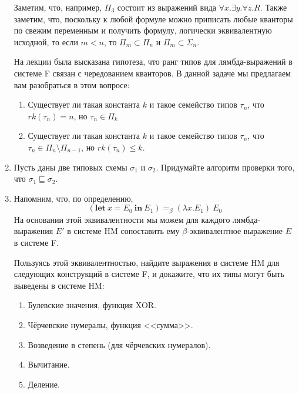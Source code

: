 \documentclass[10pt,a4paper,oneside]{article}
\begin{document}
\begin{enumerate}
Заметим, что, например, $\Pi_3$ состоит из выражений вида $\forall x.\exists y.\forall z.R$.
Также заметим, что, поскольку к любой формуле можно приписать любые кванторы по свежим переменным
и получить формулу, логически эквивалентную исходной, 
то если $m < n$, то $\Pi_m \subset \Pi_n$ и $\Pi_m \subset \Sigma_n$.

На лекции была высказана гипотеза, что ранг типов для лямбда-выражений в системе F связан с чередованием
кванторов. В данной задаче мы предлагаем вам разобраться в этом вопросе:

\begin{enumerate}
\item Существует ли такая константа $k$ и такое семейство типов $\tau_n$, что $rk(\tau_n)=n$, но $\tau_n \in \Pi_k$
\item Существует ли такая константа $k$ и такое семейство типов $\tau_n$, что $\tau_n \in \Pi_n \setminus \Pi_{n-1}$, но $rk(\tau_n) \le k$.
\end{enumerate}

\item Пусть даны две типовых схемы $\sigma_1$ и $\sigma_2$. Придумайте алгоритм проверки того, что
$\sigma_1 \sqsubseteq \sigma_2$.

\item Напомним, что, по определению, $$(\textbf{let}\ x = E_0\ \textbf{in}\ E_1) =_\beta (\lambda x.E_1)\ E_0$$
На основании этой эквивалентности мы можем для каждого лямбда-выражения $E'$ в системе HM сопоставить ему
$\beta$-эквивалентное выражение $E$ в системе F.

Пользуясь этой эквивалентностью, найдите выражения в системе HM для следующих конструкций в системе F,
и докажите, что их типы могут быть выведены в системе HM:
\begin{enumerate}
\item Булевские значения, функция XOR.
\item Чёрчевские нумералы, функция <<сумма>>.
\item Возведение в степень (для чёрчевских нумералов).
\item Вычитание.
\item Деление.
\end{enumerate}

\end{enumerate}
\end{document}
